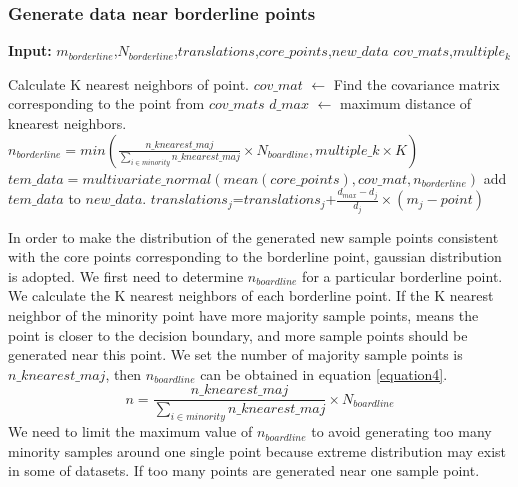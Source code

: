 \documentclass[runningheads]{llncs}
\begin{document}
\subsubsection{Generate data near borderline points}
\begin{algorithm}[htbp]
  \caption{$generate\_borderline$}
  \label{alg3}
  \hspace*{0.02in} {\bf Input:} %
   $m_{borderline}$,$N_{borderline}$,$translations$,$core\_points$,$new\_data$
   $cov\_mats$,$multiple_k$
  \begin{algorithmic}
      \State Calculate K nearest neighbors of point.
      \State $cov\_mat$ $\leftarrow$ Find the covariance matrix corresponding to the point from $cov\_mats$
      \State $d\_max$ $\leftarrow$ maximum distance of knearest neighbors.
  　　 \State $n_{borderline}=min(\frac{n\_knearest\_maj}{\sum_{i\in minority} n\_knearest\_maj}\times N_{boardline},multiple\_k \times K)$
      \State $tem\_data=multivariate\_normal(mean(core\_points),cov\_mat,n_{borderline})$
      \State add $tem\_data$ to $new\_data$.
        \State $translations_j$=$translations_j$+$\frac{d_{max}-d_{j}}{d_{j}}\times (m_{j}-point)$
      \EndFor
  \EndFor
  \end{algorithmic}
\end{algorithm}
In order to make the distribution of the generated new sample points consistent with the core
points corresponding to the borderline point, gaussian distribution is adopted.
We first need to determine $n_{boardline}$ for a particular borderline point.
We calculate the K nearest neighbors of each borderline point. 
If the K nearest neighbor of the minority point have more majority sample points, means the point 
is closer to the decision boundary, and more sample points should be generated near this point.
We set the number of majority sample points is $n\_knearest\_maj$,
then $n_{boardline}$ can be obtained in equation \ref{equation4}.
\begin{equation}
  \label{equation4}
  n=\frac{n\_knearest\_maj}{\sum_{i\in minority} n\_knearest\_maj}\times N_{boardline}
\end{equation}
We need to limit the maximum value of $n_{boardline}$
to avoid generating too many minority samples around one single point because
extreme distribution may exist in some of datasets. If too many points are generated near one sample point.
\end{document}
